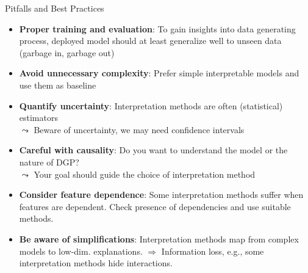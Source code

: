 \documentclass[11pt,compress,t,notes=noshow, aspectratio=169, xcolor=table]{beamer}
\begin{document}
\begin{frame}[t]{Pitfalls and Best Practices }
\begin{itemize}
    \item \textbf{Proper training and evaluation}: 
    To gain insights into data generating process, deployed model should at least generalize well to unseen data (garbage in, garbage out)
    \item \textbf{Avoid unnecessary complexity}: Prefer simple interpretable models and use them as baseline
    \item \textbf{Quantify uncertainty}: Interpretation methods are often (statistical) estimators \\
    $\leadsto$ Beware of uncertainty, we may need confidence intervals
    \item \textbf{Careful with causality}: 
     Do you want to understand the model or the nature of DGP?\\
     $\leadsto$ Your goal should guide the choice of interpretation method
    \item \textbf{Consider feature dependence}: Some interpretation methods suffer when features are dependent. Check presence of dependencies and use suitable methods.
    \item \textbf{Be aware of simplifications}: Interpretation methods map from complex models to low-dim. explanations. $\Rightarrow$ Information loss, e.g., some interpretation methods hide interactions.
\end{itemize}

\end{frame}

\endlecture
\end{document}
